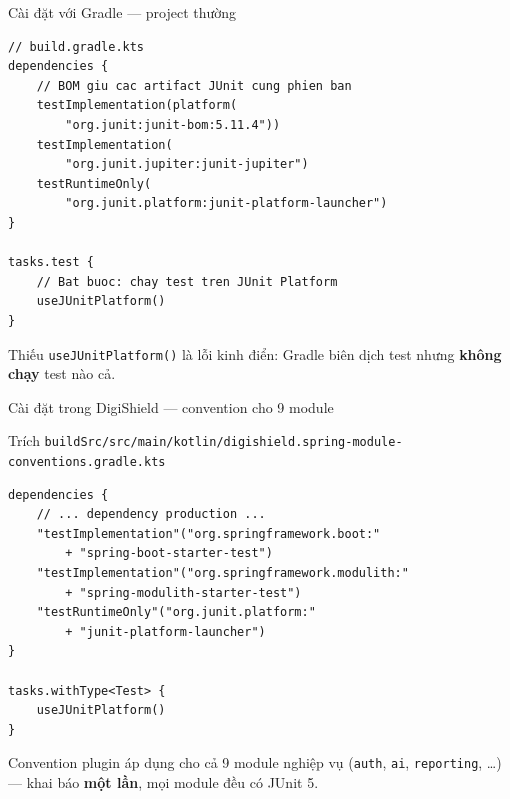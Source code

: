 \documentclass[aspectratio=169,12pt]{beamer}
\begin{document}
\begin{frame}[fragile,shrink=8]{Cài đặt với Gradle --- project thường}
\begin{lstlisting}[style=nonumber]
// build.gradle.kts
dependencies {
    // BOM giu cac artifact JUnit cung phien ban
    testImplementation(platform(
        "org.junit:junit-bom:5.11.4"))
    testImplementation(
        "org.junit.jupiter:junit-jupiter")
    testRuntimeOnly(
        "org.junit.platform:junit-platform-launcher")
}

tasks.test {
    // Bat buoc: chay test tren JUnit Platform
    useJUnitPlatform()
}
\end{lstlisting}
  {\small Thiếu \texttt{useJUnitPlatform()} là lỗi kinh điển:
  Gradle biên dịch test nhưng \textbf{không chạy} test nào cả.}
\end{frame}

\begin{frame}[fragile,shrink=8]{Cài đặt trong DigiShield --- convention cho 9 module}
  \begin{block}{\small Trích \texttt{buildSrc/src/main/kotlin/\allowbreak digishield.spring-\allowbreak module-\allowbreak conventions.gradle.kts}}
\begin{lstlisting}[style=nonumber]
dependencies {
    // ... dependency production ...
    "testImplementation"("org.springframework.boot:"
        + "spring-boot-starter-test")
    "testImplementation"("org.springframework.modulith:"
        + "spring-modulith-starter-test")
    "testRuntimeOnly"("org.junit.platform:"
        + "junit-platform-launcher")
}

tasks.withType<Test> {
    useJUnitPlatform()
}
\end{lstlisting}
  \end{block}
  \vspace{-0.2em}
  {\small Convention plugin áp dụng cho cả 9 module nghiệp vụ
  (\texttt{auth}, \texttt{ai}, \texttt{reporting}, \dots) --- khai báo
  \textbf{một lần}, mọi module đều có JUnit 5.}
\end{frame}
\end{document}
